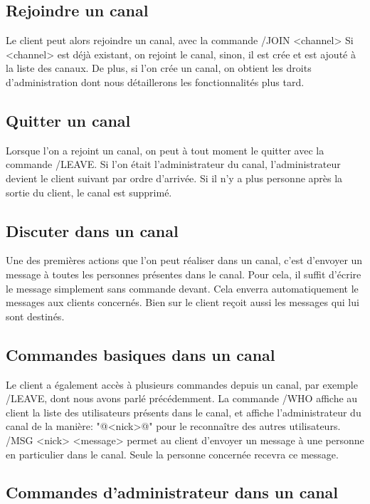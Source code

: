 \documentclass[10pt]{article}
\begin{document}
\subsection{Rejoindre un canal}

Le client peut alors rejoindre un canal, avec la commande /JOIN <channel>
Si <channel> est déjà existant, on rejoint le canal, sinon, il est crée et est ajouté à la liste des canaux.
De plus, si l'on crée un canal, on obtient les droits d'administration dont nous détaillerons les fonctionnalités plus tard.

\subsection{Quitter un canal}

Lorsque l'on a rejoint un canal, on peut à tout moment le quitter avec la commande /LEAVE. Si l'on était l'administrateur du canal, l'administrateur devient le client suivant par ordre d'arrivée.
Si il n'y a plus personne après la sortie du client, le canal est supprimé.

\subsection{Discuter dans un canal}

Une des premières actions que l'on peut réaliser dans un canal, c'est d'envoyer un message à toutes les personnes présentes dans le canal.
Pour cela, il suffit d'écrire le message simplement sans commande devant. Cela enverra automatiquement le messages aux clients concernés.
Bien sur le client reçoit aussi les messages qui lui sont destinés.

\subsection{Commandes basiques dans un canal}

Le client a également accès à plusieurs commandes depuis un canal, par exemple /LEAVE, dont nous avons parlé précédemment.
La commande /WHO affiche au client la liste des utilisateurs présents dans le canal, et affiche l'administrateur du canal de la manière: "@<nick>@" pour le reconnaître des autres utilisateurs.
/MSG <nick> <message> permet au client d'envoyer un message à une personne en particulier dans le canal. Seule la personne concernée recevra ce message.

\subsection{Commandes d'administrateur dans un canal}
\end{document}
